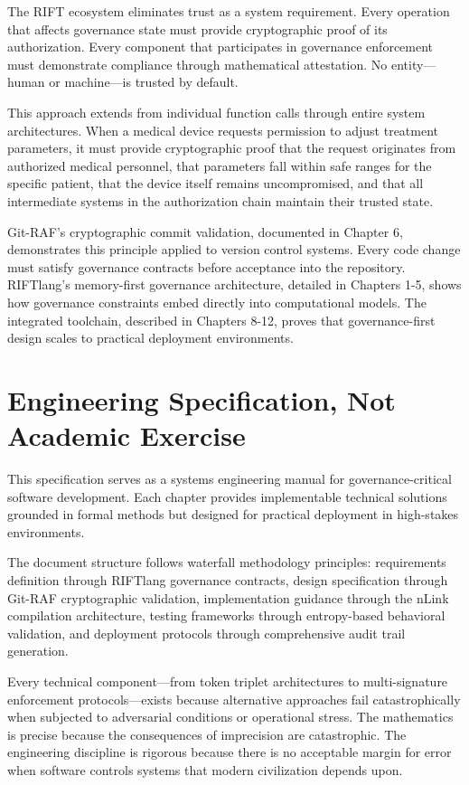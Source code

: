The RIFT ecosystem eliminates trust as a system requirement. Every operation that affects governance state must provide cryptographic proof of its authorization. Every component that participates in governance enforcement must demonstrate compliance through mathematical attestation. No entity—human or machine—is trusted by default.

This approach extends from individual function calls through entire system architectures. When a medical device requests permission to adjust treatment parameters, it must provide cryptographic proof that the request originates from authorized medical personnel, that parameters fall within safe ranges for the specific patient, that the device itself remains uncompromised, and that all intermediate systems in the authorization chain maintain their trusted state.

Git-RAF's cryptographic commit validation, documented in Chapter 6, demonstrates this principle applied to version control systems. Every code change must satisfy governance contracts before acceptance into the repository. RIFTlang's memory-first governance architecture, detailed in Chapters 1-5, shows how governance constraints embed directly into computational models. The integrated toolchain, described in Chapters 8-12, proves that governance-first design scales to practical deployment environments.

\section*{Engineering Specification, Not Academic Exercise}

This specification serves as a systems engineering manual for governance-critical software development. Each chapter provides implementable technical solutions grounded in formal methods but designed for practical deployment in high-stakes environments.

The document structure follows waterfall methodology principles: requirements definition through RIFTlang governance contracts, design specification through Git-RAF cryptographic validation, implementation guidance through the nLink compilation architecture, testing frameworks through entropy-based behavioral validation, and deployment protocols through comprehensive audit trail generation.

Every technical component—from token triplet architectures to multi-signature enforcement protocols—exists because alternative approaches fail catastrophically when subjected to adversarial conditions or operational stress. The mathematics is precise because the consequences of imprecision are catastrophic. The engineering discipline is rigorous because there is no acceptable margin for error when software controls systems that modern civilization depends upon.

